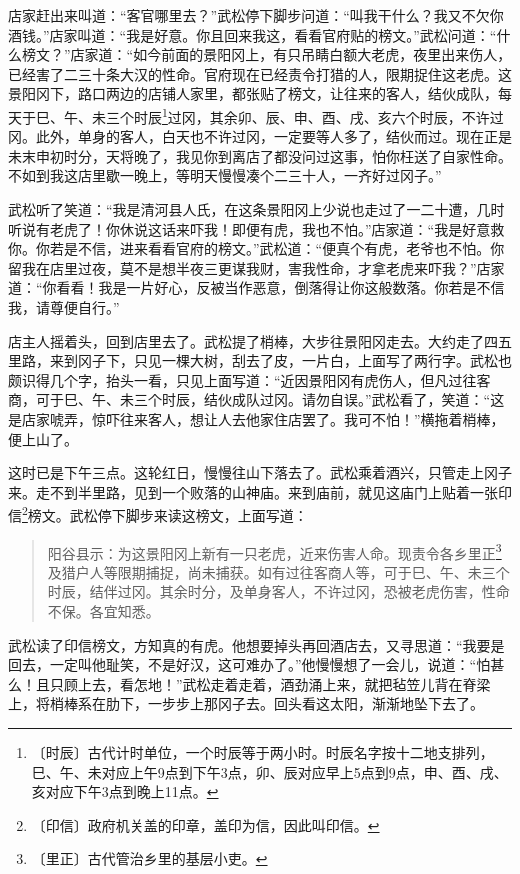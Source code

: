 \documentclass[12pt,UTF-8,openany]{ctexbook}
\begin{document}
\begin{Large}
    店家赶出来叫道：“客官哪里去？”武松停下脚步问道：“叫我干什么？我又不欠你酒钱。”店家叫道：“我是好意。你且回来我这，看看官府贴的榜文。”武松问道：“什么榜文？”店家道：“如今前面的景阳冈上，有只吊睛白额大老虎，夜里出来伤人，已经害了二三十条大汉的性命。官府现在已经责令打猎的人，限期捉住这老虎。这景阳冈下，路口两边的店铺人家里，都张贴了榜文，让往来的客人，结伙成队，每天于巳、午、未三个时辰\footnote{〔时辰〕古代计时单位，一个时辰等于两小时。时辰名字按十二地支排列，巳、午、未对应上午9点到下午3点，卯、辰对应早上5点到9点，申、酉、戌、亥对应下午3点到晚上11点。}过冈，其余卯、辰、申、酉、戌、亥六个时辰，不许过冈。此外，单身的客人，白天也不许过冈，一定要等人多了，结伙而过。现在正是未末申初时分，天将晚了，我见你到离店了都没问过这事，怕你枉送了自家性命。不如到我这店里歇一晚上，等明天慢慢凑个二三十人，一齐好过冈子。”
    
    武松听了笑道：“我是清河县人氏，在这条景阳冈上少说也走过了一二十遭，几时听说有老虎了！你休说这话来吓我！即便有虎，我也不怕。”店家道：“我是好意救你。你若是不信，进来看看官府的榜文。”武松道：“便真个有虎，老爷也不怕。你留我在店里过夜，莫不是想半夜三更谋我财，害我性命，才拿老虎来吓我？”店家道：“你看看！我是一片好心，反被当作恶意，倒落得让你这般数落。你若是不信我，请尊便自行。”
    
    店主人摇着头，回到店里去了。武松提了梢棒，大步往景阳冈走去。大约走了四五里路，来到冈子下，只见一棵大树，刮去了皮，一片白，上面写了两行字。武松也颇识得几个字，抬头一看，只见上面写道：“近因景阳冈有虎伤人，但凡过往客商，可于巳、午、未三个时辰，结伙成队过冈。请勿自误。”武松看了，笑道：“这是店家唬弄，惊吓往来客人，想让人去他家住店罢了。我可不怕！”横拖着梢棒，便上山了。
    
    这时已是下午三点。这轮红日，慢慢往山下落去了。武松乘着酒兴，只管走上冈子来。走不到半里路，见到一个败落的山神庙。来到庙前，就见这庙门上贴着一张印信\footnote{〔印信〕政府机关盖的印章，盖印为信，因此叫印信。}榜文。武松停下脚步来读这榜文，上面写道：
    
    \begin{quotation}
    
    阳谷县示：为这景阳冈上新有一只老虎，近来伤害人命。现责令各乡里正\footnote{〔里正〕古代管治乡里的基层小吏。}及猎户人等限期捕捉，尚未捕获。如有过往客商人等，可于巳、午、未三个时辰，结伴过冈。其余时分，及单身客人，不许过冈，恐被老虎伤害，性命不保。各宜知悉。
    
    \end{quotation}
    
    武松读了印信榜文，方知真的有虎。他想要掉头再回酒店去，又寻思道：“我要是回去，一定叫他耻笑，不是好汉，这可难办了。”他慢慢想了一会儿，说道：“怕甚么！且只顾上去，看怎地！”武松走着走着，酒劲涌上来，就把毡笠儿背在脊梁上，将梢棒系在肋下，一步步上那冈子去。回头看这太阳，渐渐地坠下去了。
    

\end{Large}
\end{document}
